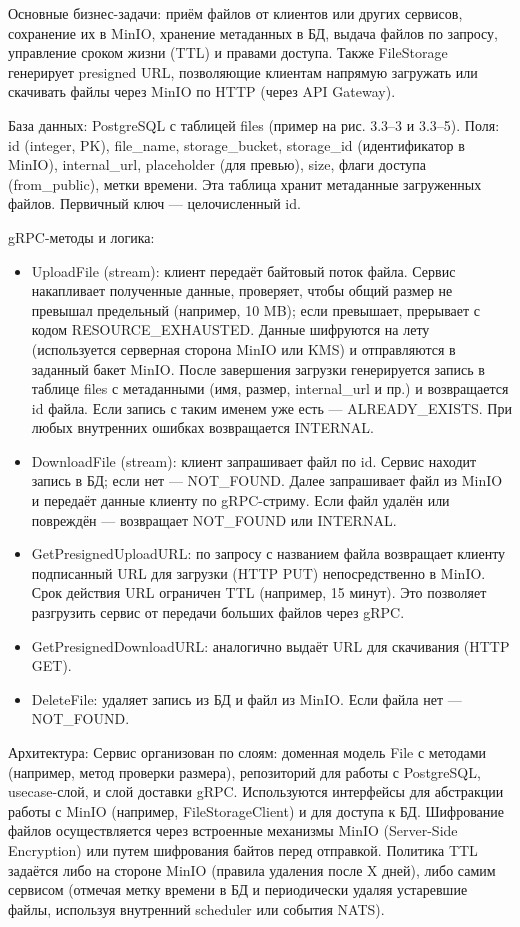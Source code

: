 Основные бизнес-задачи: приём файлов от клиентов или других сервисов, сохранение их в MinIO, хранение метаданных в БД, выдача файлов по запросу, управление сроком жизни (TTL) и правами доступа. Также FileStorage генерирует presigned URL, позволяющие клиентам напрямую загружать или скачивать файлы через MinIO по HTTP (через API Gateway).

База данных: PostgreSQL с таблицей files (пример на рис. 3.3–3 и 3.3–5). Поля: id (integer, PK), file\_name, storage\_bucket, storage\_id (идентификатор в MinIO), internal\_url, placeholder (для превью), size, флаги доступа (from\_public), метки времени. Эта таблица хранит метаданные загруженных файлов. Первичный ключ — целочисленный id.

gRPC-методы и логика:
\begin{itemize}
    \item UploadFile (stream): клиент передаёт байтовый поток файла. Сервис накапливает полученные данные, проверяет, чтобы общий размер не превышал предельный (например, 10 MB); если превышает, прерывает с кодом RESOURCE\_EXHAUSTED. Данные шифруются на лету (используется серверная сторона MinIO или KMS) и отправляются в заданный бакет MinIO. После завершения загрузки генерируется запись в таблице files с метаданными (имя, размер, internal\_url и пр.) и возвращается id файла. Если запись с таким именем уже есть — ALREADY\_EXISTS. При любых внутренних ошибках возвращается INTERNAL.
    \item DownloadFile (stream): клиент запрашивает файл по id. Сервис находит запись в БД; если нет — NOT\_FOUND. Далее запрашивает файл из MinIO и передаёт данные клиенту по gRPC-стриму. Если файл удалён или повреждён — возвращает NOT\_FOUND или INTERNAL.
    \item GetPresignedUploadURL: по запросу с названием файла возвращает клиенту подписанный URL для загрузки (HTTP PUT) непосредственно в MinIO. Срок действия URL ограничен TTL (например, 15 минут). Это позволяет разгрузить сервис от передачи больших файлов через gRPC.
    \item GetPresignedDownloadURL: аналогично выдаёт URL для скачивания (HTTP GET).
    \item DeleteFile: удаляет запись из БД и файл из MinIO. Если файла нет — NOT\_FOUND.
\end{itemize}
Архитектура: Сервис организован по слоям: доменная модель File с методами (например, метод проверки размера), репозиторий для работы с PostgreSQL, usecase-слой, и слой доставки gRPC. Используются интерфейсы для абстракции работы с MinIO (например, FileStorageClient) и для доступа к БД. Шифрование файлов осуществляется через встроенные механизмы MinIO (Server-Side Encryption) или путем шифрования байтов перед отправкой. Политика TTL задаётся либо на стороне MinIO (правила удаления после X дней), либо самим сервисом (отмечая метку времени в БД и периодически удаляя устаревшие файлы, используя внутренний scheduler или события NATS).

